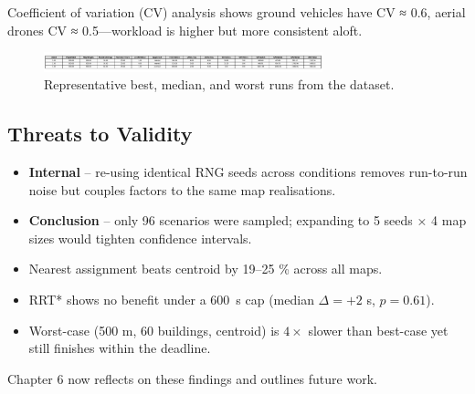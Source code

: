 \documentclass[12pt,a4paper]{report}
\begin{document}
\smallskip
Coefficient of variation (CV) analysis shows ground vehicles have
CV ≈ 0.6, aerial drones CV ≈ 0.5—workload is higher but more consistent aloft.

\begin{figure}[H]
  \centering
  \includegraphics[width=0.72\textwidth]{analysis/representative_runs.png}
  \caption{Representative best, median, and worst runs from the dataset.}
  \label{fig:repruns}
\end{figure}

\subsection*{Threats to Validity}
\begin{itemize}
  \item \textbf{Internal} – re-using identical RNG seeds across conditions
        removes run-to-run noise but couples factors to the same map
        realisations.  
  \item \textbf{Conclusion} – only 96 scenarios were sampled;
        expanding to 5 seeds × 4 map sizes would tighten confidence
        intervals.
\end{itemize}

\begin{tcolorbox}[colback=gray!10,title=\textbf{Take-away 5.1}]
\begin{itemize}[leftmargin=1.2em]
  \item Nearest assignment beats centroid by 19–25 \% across all maps.
  \item RRT* shows no benefit under a \SI{600}{\second} cap (median \(\Delta = +2\) s, \(p = 0.61\)).
  \item Worst-case (500 m, 60 buildings, centroid) is \(4 \times\) slower than
        best-case yet still finishes within the deadline.
\end{itemize}
\end{tcolorbox}

\vspace{0.6em}
Chapter 6 now reflects on these findings and outlines future work.

\end{document}
